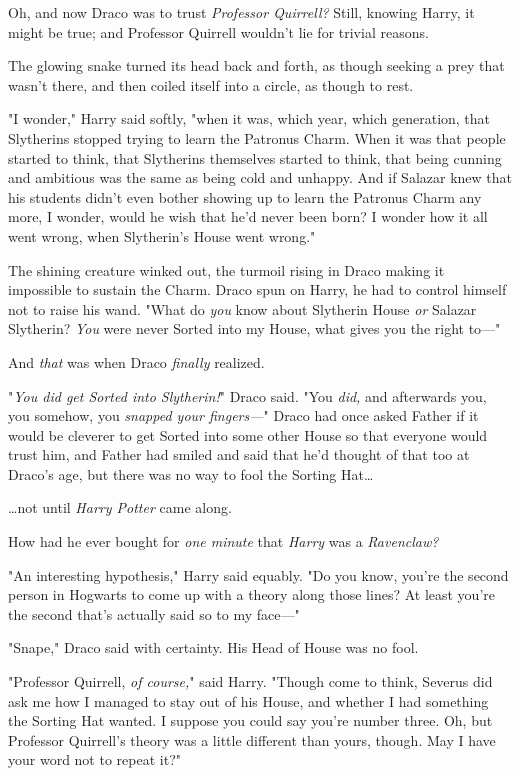 Oh, and now Draco was to trust \emph{Professor Quirrell?} Still, knowing Harry, 
it might be true; and Professor Quirrell wouldn't lie for trivial reasons.

The glowing snake turned its head back and forth, as though seeking a prey that 
wasn't there, and then coiled itself into a circle, as though to rest.

"I wonder," Harry said softly, "when it was, which year, which generation, that 
Slytherins stopped trying to learn the Patronus Charm. When it was that people 
started to think, that Slytherins themselves started to think, that being 
cunning and ambitious was the same as being cold and unhappy. And if Salazar 
knew that his students didn't even bother showing up to learn the Patronus 
Charm any more, I wonder, would he wish that he'd never been born? I wonder how 
it all went wrong, when Slytherin's House went wrong."

The shining creature winked out, the turmoil rising in Draco making it 
impossible to sustain the Charm. Draco spun on Harry, he had to control himself 
not to raise his wand. "What do \emph{you} know about Slytherin House \emph{or} 
Salazar Slytherin? \emph{You} were never Sorted into my House, what gives you 
the right to---"

And \emph{that} was when Draco \emph{finally} realized.

"\emph{You did get Sorted into Slytherin!}" Draco said. "You \emph{did,} and 
afterwards you, you somehow, you \emph{snapped your fingers---}" Draco had once 
asked Father if it would be cleverer to get Sorted into some other House so 
that everyone would trust him, and Father had smiled and said that he'd thought 
of that too at Draco's age, but there was no way to fool the Sorting Hat{\ldots}

{\ldots}not until \emph{Harry Potter} came along.

How had he ever bought for \emph{one minute} that \emph{Harry} was a 
\emph{Ravenclaw?}

"An interesting hypothesis," Harry said equably. "Do you know, you're the 
second person in Hogwarts to come up with a theory along those lines? At least 
you're the second that's actually said so to my face---"

"Snape," Draco said with certainty. His Head of House was no fool.

"Professor Quirrell, \emph{of course,}" said Harry. "Though come to think, 
Severus did ask me how I managed to stay out of his House, and whether I had 
something the Sorting Hat wanted. I suppose you could say you're number three. 
Oh, but Professor Quirrell's theory was a little different than yours, though. 
May I have your word not to repeat it?"

